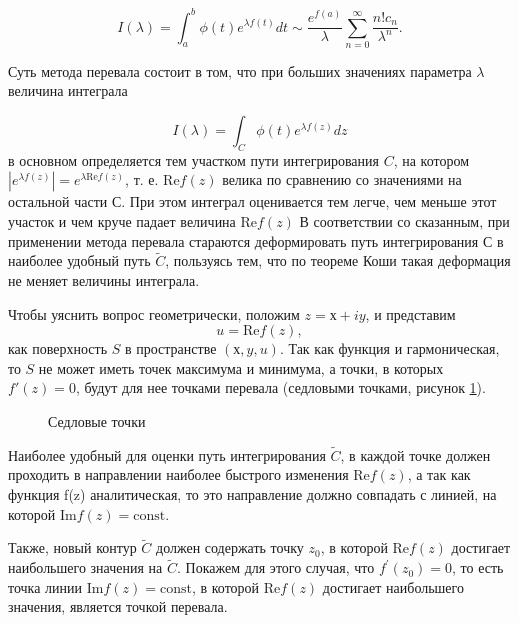 \documentclass[14pt, a4paper]{article}
\numberwithin{figure}{section}
\numberwithin{equation}{section}
\renewcommand{\Re}{\mathrm{Re}}
\renewcommand{\Im}{\mathrm{Im}}
\newcommand{\const}{\mathrm{const}}
\begin{document}
\begin{equation}\label{eq:eq10}
I(\lambda) = \int_{a}^{b}\phi(t)e^{\lambda f(t)}dt \sim \frac{e^{f(a)}}{\lambda}\sum_{n=0}^{\infty}\frac{n! c_n}{\lambda^n}.
\end{equation}

Суть метода перевала состоит в том, что при больших значениях параметра $\lambda$ величина интеграла

$$
I(\lambda) = \int_{C}^{}\phi(t)e^{\lambda f(z)}dz
$$
в основном определяется тем участком пути интегрирования $C$, на котором $|e^{\lambda f(z)}|=e^{\lambda \Re f(z)}$, т. е. $\Re f(z)$ велика по сравнению со значениями на остальной части $С$. При этом интеграл оценивается тем легче, чем меньше этот участок и чем круче падает величина $\Re f(z)$ В соответствии со сказанным, при применении метода перевала стараются деформировать путь интегрирования С в наиболее удобный путь $\widetilde{C}$, пользуясь тем, что по теореме Коши такая деформация не меняет величины интеграла.\cite{Urmat}

Чтобы уяснить вопрос геометрически, положим $z = х + iy$, и представим
$$
u = \Re f(z),
$$
как поверхность $S$ в пространстве $(х, y, u)$. Так как функция и гармоническая, то $S$ не может иметь точек максимума и минимума, а точки, в которых $f'(z) = 0$, будут для нее точками перевала (седловыми точками, рисунок \ref{ris:image2}).

\begin{figure}[h]
	\caption{Седловые точки}
	\label{ris:image2}
	\end{figure}

Наиболее удобный для оценки путь интегрирования $\widetilde{C}$, в каждой точке должен проходить в направлении наиболее быстрого изменения $\Re f(z)$, а так как функция f(z) аналитическая, то это направление должно совпадать с линией, на которой $\Im f(z) = \const$. 

Также, новый контур $\widetilde{C}$ должен содержать точку $z_0$, в которой $\Re f(z)$ достигает наибольшего значения на $\widetilde{C}$. Покажем для этого случая, что $f^\prime (z_0) = 0$, то есть точка линии $\Im f(z) = \const$, в которой $\Re f (z)$ достигает наибольшего значения, является точкой перевала.
\end{document}
